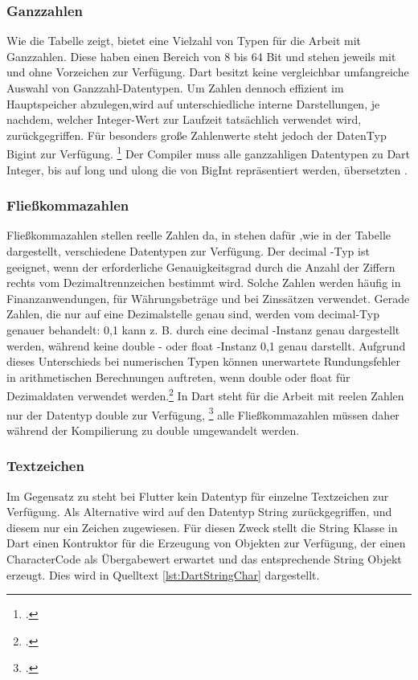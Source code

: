 \subsubsection{Ganzzahlen}
Wie die Tabelle zeigt,  bietet \Csharp eine Vielzahl von Typen für die Arbeit mit Ganzzahlen.  Diese haben einen Bereich von 8 bis 64 Bit und stehen jeweils mit und ohne Vorzeichen zur Verfügung.  Dart besitzt keine vergleichbar umfangreiche Auswahl von Ganzzahl-Datentypen.  Um Zahlen dennoch effizient im Hauptspeicher abzulegen,wird auf unterschiedliche interne Darstellungen,  je nachdem,  welcher Integer-Wert zur Laufzeit tatsächlich verwendet wird, zurückgegriffen.  Für besonders große Zahlenwerte steht jedoch der DatenTyp \glq Bigint \grq{}  zur Verfügung.  \footcite[Vgl. ][Abgerufen am \today]{Ford2019} Der Compiler muss alle ganzzahligen  \Csharp Datentypen zu Dart \glq Integer\grq,  bis auf \glq long\grq{} und \glq ulong\grq{} die von \glq BigInt\grq{}  repräsentiert werden, übersetzten . 

\subsubsection{Fließkommazahlen}
Fließkommazahlen stellen reelle Zahlen da,  in \Csharp stehen dafür ,wie in der Tabelle dargestellt,  verschiedene Datentypen zur Verfügung.  Der  \glq decimal\grq{} -Typ ist geeignet, wenn der erforderliche Genauigkeitsgrad durch die Anzahl der Ziffern rechts vom Dezimaltrennzeichen bestimmt wird.  Solche Zahlen werden häufig in Finanzanwendungen, für Währungsbeträge und bei Zinssätzen verwendet. Gerade Zahlen, die nur auf eine Dezimalstelle genau sind, werden vom  \glq decimal\grq{}-Typ genauer behandelt: 0,1 kann z. B. durch eine  \glq decimal\grq{} -Instanz genau dargestellt werden, während keine  \glq double\grq{} - oder  \glq float\grq{} -Instanz 0,1 genau darstellt.  Aufgrund dieses Unterschieds bei numerischen Typen können unerwartete Rundungsfehler in arithmetischen Berechnungen auftreten, wenn double oder float für Dezimaldaten verwendet werden.\footcite[Vgl. ][Abgerufen am \today]{MicrosoftFlieskomma2021}
In Dart steht für die Arbeit mit reelen Zahlen nur der Datentyp \glq  double\grq{} zur Verfügung, \footcite[Vgl. ][Abgerufen am \today]{GoogleDouble} alle Fließkommazahlen müssen daher während der Kompilierung zu \glq double\grq{} umgewandelt werden.
\subsubsection{Textzeichen}
Im Gegensatz zu \Csharp steht bei Flutter kein Datentyp für einzelne Textzeichen zur Verfügung.  Als Alternative wird auf den Datentyp \glq String \grq{} zurückgegriffen,  und diesem nur ein Zeichen zugewiesen.  Für diesen Zweck stellt die String Klasse in Dart einen Kontruktor für die Erzeugung von Objekten zur Verfügung, der einen CharacterCode als Übergabewert erwartet und das entsprechende String Objekt erzeugt.  Dies wird in Quelltext \ref{lst:DartStringChar} dargestellt.



